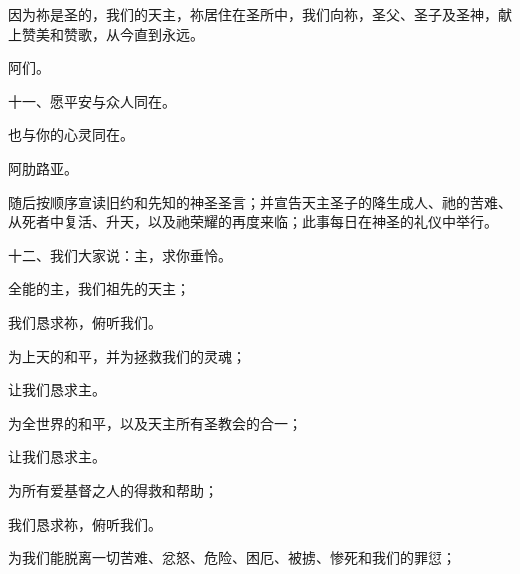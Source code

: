 \par

因为祢是圣的，我们的天主，祢居住在圣所中，我们向祢，圣父、圣子及圣神，献上赞美和赞歌，从今直到永远。\par

\par

阿们。\par

\par

十一、愿平安与众人同在。\par

\par

也与你的心灵同在。\par

\par

阿肋路亚。\par

随后按顺序宣读旧约和先知的神圣圣言；并宣告天主圣子的降生成人、祂的苦难、从死者中复活、升天，以及祂荣耀的再度来临；此事每日在神圣的礼仪中举行。\par

\par

十二、我们大家说：主，求你垂怜。\par

全能的主，我们祖先的天主；\par

我们恳求祢，俯听我们。\par

为上天的和平，并为拯救我们的灵魂；\par

让我们恳求主。\par

为全世界的和平，以及天主所有圣教会的合一；\par

让我们恳求主。\par

为所有爱基督之人的得救和帮助；\par

我们恳求祢，俯听我们。\par

为我们能脱离一切苦难、忿怒、危险、困厄、被掳、惨死和我们的罪愆；\par

